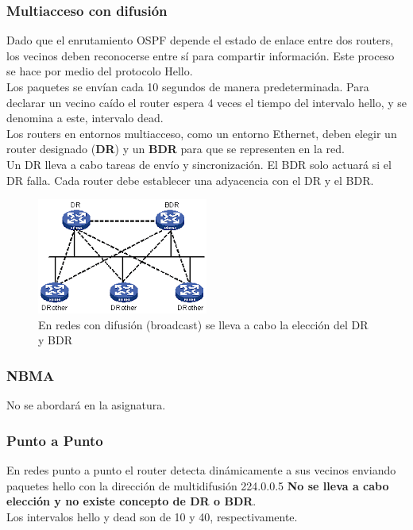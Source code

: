 \documentclass[12pt]{article}
\begin{document}
\subsubsection{Multiacceso con difusión}
Dado que el enrutamiento OSPF depende el estado de enlace entre dos routers, los vecinos deben reconocerse entre sí para compartir información. Este proceso se hace por medio del protocolo Hello.\\

Los paquetes se envían cada 10 segundos de manera predeterminada. Para declarar un vecino caído el router espera 4 veces el tiempo del intervalo hello, y se denomina a este, intervalo dead.\\

Los routers en entornos multiacceso, como un entorno Ethernet, deben elegir un router designado (\textbf{DR}) y un \textbf{BDR} para que se representen en la red.\\

Un DR lleva a cabo tareas de envío y sincronización. El BDR solo actuará si el DR falla. Cada router debe establecer una adyacencia con el DR y el BDR.

\begin{figure}[h]
\centering
\includegraphics[scale=1.5]{ospf_dr_bdr.png}
\caption{En redes con difusión (broadcast) se lleva a cabo la elección del DR y BDR}
\end{figure}

\subsubsection{NBMA}
No se abordará en la asignatura.

\subsubsection{Punto a Punto}
En redes punto a punto el router detecta dinámicamente a sus vecinos enviando paquetes hello con la dirección de multidifusión 224.0.0.5
\textbf{No se lleva a cabo elección y no existe concepto de DR o BDR}.\\
Los intervalos hello y dead son de 10 y 40, respectivamente.
\end{document}
